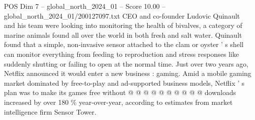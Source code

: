 \begin{textsample}{POS Dim 7 – global\_north\_2024\_01 – Score 10.00 – global\_north\_2024\_01/200127097.txt}
CEO and co-founder Ludovic Quinault and his team were looking into monitoring the health of bivalves, a category of marine animals found all over the world in both fresh and salt water.
Quinault found that a simple, non-invasive sensor attached to the clam or oyster ' s shell can monitor everything from feeding to reproduction and stress responses like suddenly shutting or failing to open at the normal time.
Just over two years ago, Netflix announced it would enter a new business : gaming.
Amid a mobile gaming market dominated by free-to-play and ad-supported business models, Netflix ' s plan was to make its games free without @ @ @ @ @ @ @ @ @ @ downloads increased by over 180 \% year-over-year, according to estimates from market intelligence firm Sensor Tower.

\end{textsample}

